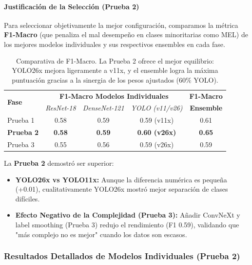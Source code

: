 \documentclass[12pt,a4paper]{article}
\begin{document}
\paragraph{Justificación de la Selección (Prueba 2)}
Para seleccionar objetivamente la mejor configuración, comparamos la métrica \textbf{F1-Macro} (que penaliza el mal desempeño en clases minoritarias como MEL) de los mejores modelos individuales y sus respectivos ensembles en cada fase.

\begin{table}[H]
\centering
\begin{tabular}{l|ccc|c}
\toprule
\multirow{2}{*}{\textbf{Fase}} & \multicolumn{3}{c|}{\textbf{F1-Macro Modelos Individuales}} & \textbf{F1-Macro} \\
& \textit{ResNet-18} & \textit{DenseNet-121} & \textit{YOLO (v11/v26)} & \textbf{Ensemble} \\
\midrule
Prueba 1 & 0.58 & 0.59 & 0.59 (v11x) & 0.61 \\
\rowcolor{green!10} \textbf{Prueba 2} & \textbf{0.58} & \textbf{0.59} & \textbf{0.60 (v26x)} & \textbf{0.65} \\
Prueba 3 & 0.55 & 0.56 & 0.59 (v26x) & 0.59 \\
\bottomrule
\end{tabular}
\caption{Comparativa de F1-Macro. La Prueba 2 ofrece el mejor equilibrio: YOLO26x mejora ligeramente a v11x, y el ensemble logra la máxima puntuación gracias a la sinergia de los pesos ajustados (60\% YOLO).}
\label{tab:comparativa_f1}
\end{table}

La \textbf{Prueba 2} demostró ser superior:
\begin{itemize}
    \item \textbf{YOLO26x vs YOLO11x:} Aunque la diferencia numérica es pequeña (+0.01), cualitativamente YOLO26x mostró mejor separación de clases difíciles.
    \item \textbf{Efecto Negativo de la Complejidad (Prueba 3):} Añadir ConvNeXt y label smoothing (Prueba 3) redujo el rendimiento (F1 0.59), validando que "más complejo no es mejor" cuando los datos son escasos.
\end{itemize}

\subsubsection{Resultados Detallados de Modelos Individuales (Prueba 2)}
\end{document}

